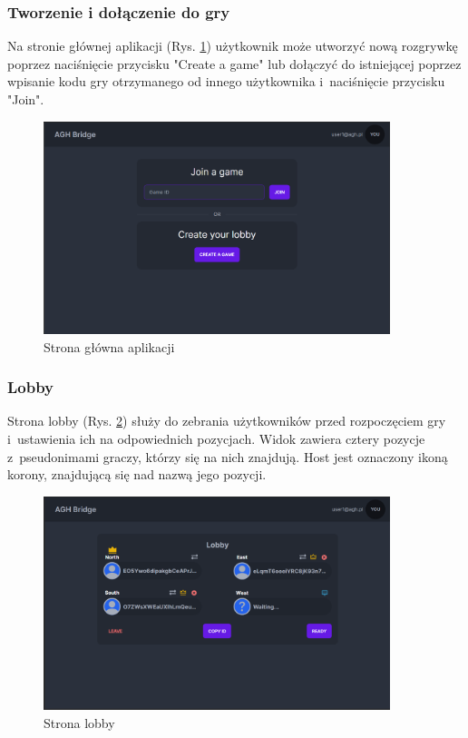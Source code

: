 \FloatBarrier

\subsubsection{Tworzenie i dołączenie do gry}

Na stronie głównej aplikacji (Rys. \ref{fig:home}) użytkownik może utworzyć nową
rozgrywkę poprzez naciśnięcie przycisku "Create a game"\xspace lub dołączyć do istniejącej
poprzez wpisanie kodu gry otrzymanego od innego użytkownika i~naciśnięcie
przycisku "Join".

\begin{figure}[h!]
  \centering
  \includegraphics[width=0.9\textwidth]{img/widoki/home.png}
  \caption{Strona główna aplikacji}
  \label{fig:home}
\end{figure}

\FloatBarrier

\subsubsection{Lobby}

Strona lobby (Rys. \ref{fig:lobby}) służy do zebrania
użytkowników przed rozpoczęciem gry i~ustawienia ich
na odpowiednich pozycjach. Widok zawiera cztery pozycje
z~pseudonimami graczy, którzy się na nich znajdują.
Host jest oznaczony ikoną korony, znajdującą się nad nazwą
jego pozycji.

\begin{figure}[h!]
  \centering
  \includegraphics[width=0.9\textwidth]{img/widoki/lobby.png}
  \caption{Strona lobby}
  \label{fig:lobby}
\end{figure}

